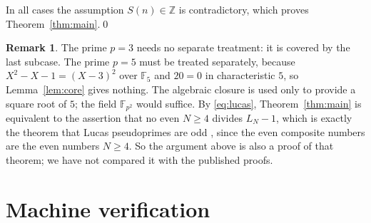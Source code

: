 \documentclass[11pt]{amsart}
\theoremstyle{plain}
\theoremstyle{definition}
\newtheorem{remark}[theorem]{Remark}
\newcommand{\Z}{\mathbb{Z}}
\newcommand{\F}{\mathbb{F}}
\begin{document}
In all cases the assumption $S(n)\in\Z$ is contradictory, which proves Theorem~\ref{thm:main}.\qed

\begin{remark}
The prime $p=3$ needs no separate treatment: it is covered by the last subcase.
The prime $p=5$ must be treated separately, because $X^2-X-1=(X-3)^2$ over $\F_5$ and $20=0$ in characteristic $5$, so Lemma~\ref{lem:core} gives nothing.
The algebraic closure is used only to provide a square root of $5$; the field $\F_{p^2}$ would suffice.
By \eqref{eq:lucas}, Theorem~\ref{thm:main} is equivalent to the assertion that no even $N\ge4$ divides $L_N-1$, which is exactly the theorem that Lucas pseudoprimes are odd \cite{WHD,DP,Br}, since the even composite numbers are the even numbers $N\ge4$. So the argument above is also a proof of that theorem; we have not compared it with the published proofs.
\end{remark}

\section{Machine verification}\label{sec:lean}
\end{document}
